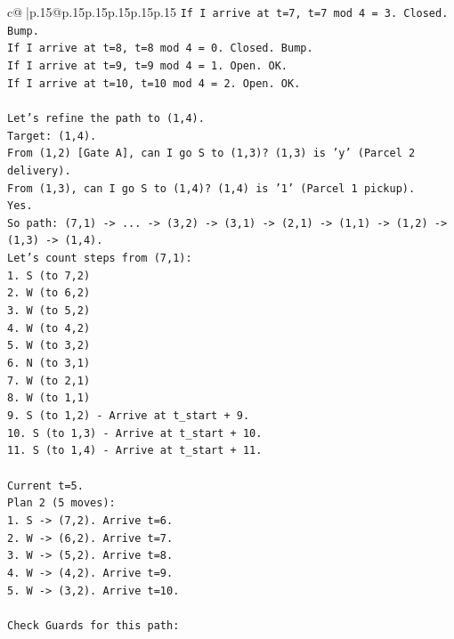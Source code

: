 \documentclass{article}
\begin{document}
{\begin{supertabular}{c@{$\;$}|p{.15\linewidth}@{}p{.15\linewidth}p{.15\linewidth}p{.15\linewidth}p{.15\linewidth}p{.15\linewidth}}
{{{\texttt{If I arrive at t=7, t=7 mod 4 = 3. Closed. Bump.} \\
\texttt{If I arrive at t=8, t=8 mod 4 = 0. Closed. Bump.} \\
\texttt{If I arrive at t=9, t=9 mod 4 = 1. Open. OK.} \\
\texttt{If I arrive at t=10, t=10 mod 4 = 2. Open. OK.} \\
\\ 
\texttt{Let's refine the path to (1,4).} \\
\texttt{Target: (1,4).} \\
\texttt{From (1,2) {[}Gate A{]}, can I go S to (1,3)? (1,3) is 'y' (Parcel 2 delivery).} \\
\texttt{From (1,3), can I go S to (1,4)? (1,4) is '1' (Parcel 1 pickup).} \\
\texttt{Yes.} \\
\texttt{So path: (7,1) {-}> ... {-}> (3,2) {-}> (3,1) {-}> (2,1) {-}> (1,1) {-}> (1,2) {-}> (1,3) {-}> (1,4).} \\
\texttt{Let's count steps from (7,1):} \\
\texttt{1. S (to 7,2)} \\
\texttt{2. W (to 6,2)} \\
\texttt{3. W (to 5,2)} \\
\texttt{4. W (to 4,2)} \\
\texttt{5. W (to 3,2)} \\
\texttt{6. N (to 3,1)} \\
\texttt{7. W (to 2,1)} \\
\texttt{8. W (to 1,1)} \\
\texttt{9. S (to 1,2) {-} Arrive at t\_start + 9.} \\
\texttt{10. S (to 1,3) {-} Arrive at t\_start + 10.} \\
\texttt{11. S (to 1,4) {-} Arrive at t\_start + 11.} \\
\\ 
\texttt{Current t=5.} \\
\texttt{Plan 2 (5 moves):} \\
\texttt{1. S {-}> (7,2). Arrive t=6.} \\
\texttt{2. W {-}> (6,2). Arrive t=7.} \\
\texttt{3. W {-}> (5,2). Arrive t=8.} \\
\texttt{4. W {-}> (4,2). Arrive t=9.} \\
\texttt{5. W {-}> (3,2). Arrive t=10.} \\
\\ 
\texttt{Check Guards for this path:} \\
}}}
\end{supertabular}}
\end{document}
